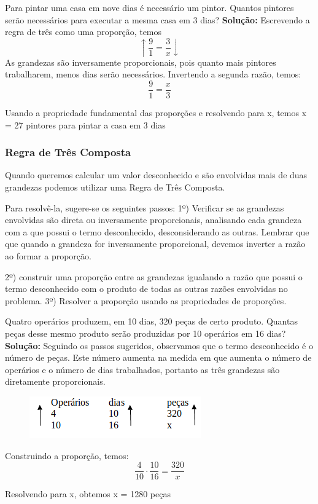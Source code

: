 \begin{texemplo}

	Para pintar uma casa em nove dias é necessário um pintor. Quantos pintores serão necessários para executar a mesma casa em 3 dias?
	\textbf{Solução:} Escrevendo a regra de três como uma proporção, temos 
	$$\uparrow \dfrac{9}{1} = \dfrac{3}{x} \downarrow$$
	As grandezas são inversamente proporcionais, pois quanto mais pintores trabalharem, menos dias serão necessários. Invertendo a segunda razão, temos:
	$$\dfrac{9}{1} = \dfrac{x}{3}$$ 
 
	Usando a propriedade fundamental das proporções e resolvendo para x, temos x = 27 pintores para pintar a casa em 3 dias \qedsymbol{}

\end{texemplo}

\subsubsection{Regra de Três Composta}
	Quando queremos calcular um valor desconhecido e são envolvidas mais de duas grandezas podemos utilizar uma Regra de Três Composta. 

	Para resolvê-la, sugere-se os seguintes passos: \linebreak
	1º) Verificar se as grandezas envolvidas são direta ou inversamente proporcionais, analisando cada grandeza com a que possui o termo desconhecido, desconsiderando as outras. Lembrar que que quando a grandeza for inversamente proporcional, devemos inverter a razão ao formar a proporção.

	2º) construir uma proporção entre as grandezas igualando a razão que possui o termo desconhecido com o produto de todas as outras razões envolvidas no problema. \linebreak
	3º) Resolver a proporção usando as propriedades de proporções.

\begin{texemplo}

	Quatro operários produzem, em 10 dias, 320 peças de certo produto. Quantas peças desse mesmo produto serão produzidas por 10 operários em 16 dias?
	\textbf{Solução:} Seguindo os passos sugeridos, observamos que o termo desconhecido é o número de peças. Este número aumenta na medida em que aumenta o número de operários e o número de dias trabalhados, portanto as três grandezas são diretamente proporcionais.

\begin{figure}[H]
	\begin{center}
		\includegraphics{capitulos/grandezas_proporcionais/media/image08.png}
	\end{center}
\end{figure}

Construindo a proporção, temos:
$$\dfrac{4}{10} \cdot \dfrac{10}{16}=\dfrac{320}{x}$$

Resolvendo para x, obtemos  x = 1280 peças \qedsymbol{}
\end{texemplo}

